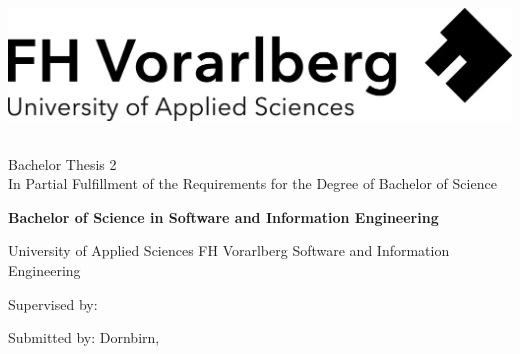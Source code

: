 \cleardoublepage   %
\thispagestyle{empty}
\begin{titlepage}
    \begin{flushright}
        \includegraphics[width=0.4\linewidth]{../src/other-pages/title/Logo-A3.jpg}
    \end{flushright}
    \begin{flushleft}
        \vspace{0.5cm}

        \section*{\maintitle}

        \vspace{0.5cm}

        Bachelor Thesis 2\\
        In Partial Fulfillment
        of the Requirements for the Degree of
        Bachelor of Science

        \vspace{0.5cm}

        \textbf{Bachelor of Science in Software and Information Engineering}

        \vspace{1cm}
        University of Applied Sciences FH Vorarlberg\newline
        Software and Information Engineering

        \vspace{0.5cm}

        Supervised by:\newline
        \phantom{x}\hspace{3ex}\supervisor\newline
        \vspace{0.5cm}

        Submitted by:\newline
        \phantom{x}\hspace{3ex}\name\newline
        \newline
        Dornbirn, \submissionMonth\space\submissionYear
    \end{flushleft}
\end{titlepage}
